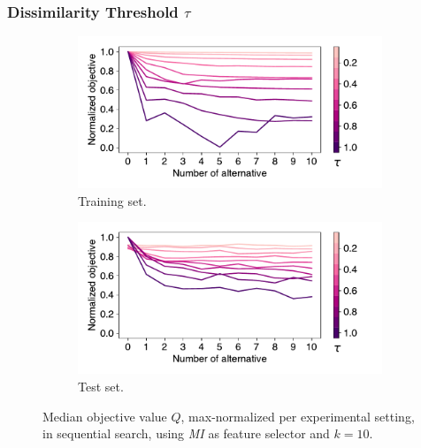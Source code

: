 \documentclass{article}
\theoremstyle{definition}
\begin{document}
\subsubsection{Dissimilarity Threshold \texorpdfstring{$\tau$}{}} %
\label{sec:evaluation:search:tau}

\begin{figure}[htb]
	\centering
	\begin{subfigure}{0.48\textwidth}
		\centering
		\includegraphics[width=\textwidth, trim=5 15 30 10, clip]{plots/impact-num-alternatives-train-objective-tau.pdf}
		\caption{Training set.}
		\label{fig:impact-num-alternatives-train-objective-tau}
	\end{subfigure}
	\hfill
	\begin{subfigure}{0.48\textwidth}
		\centering
		\includegraphics[width=\textwidth, trim=5 15 30 10, clip]{plots/impact-num-alternatives-test-objective-tau.pdf}
		\caption{Test set.}
		\label{fig:impact-num-alternatives-test-objective-tau}
	\end{subfigure}
	\caption{Median objective value $Q$, max-normalized per experimental setting, in sequential search, using \emph{MI} as feature selector and $k=10$.}
	\label{fig:impact-num-alternatives-objective-tau}
\end{figure}
\end{document}
